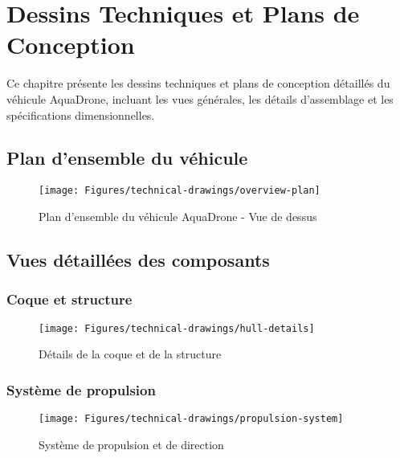 \chapter{Dessins Techniques et Plans de Conception}
\label{app:technical-drawings}

Ce chapitre présente les dessins techniques et plans de conception détaillés du véhicule AquaDrone, incluant les vues générales, les détails d'assemblage et les spécifications dimensionnelles.

\section{Plan d'ensemble du véhicule}
\begin{figure}[!htbp]
    \centering
    \texttt{[image: Figures/technical-drawings/overview-plan]}
    \caption{Plan d'ensemble du véhicule AquaDrone - Vue de dessus}
    \label{fig:overview-plan}
\end{figure}

\section{Vues détaillées des composants}
\subsection{Coque et structure}
\begin{figure}[!htbp]
    \centering
    \texttt{[image: Figures/technical-drawings/hull-details]}
    \caption{Détails de la coque et de la structure}
    \label{fig:hull-details}
\end{figure}

\subsection{Système de propulsion}
\begin{figure}[!htbp]
    \centering
    \texttt{[image: Figures/technical-drawings/propulsion-system]}
    \caption{Système de propulsion et de direction}
    \label{fig:propulsion-system}
\end{figure}

